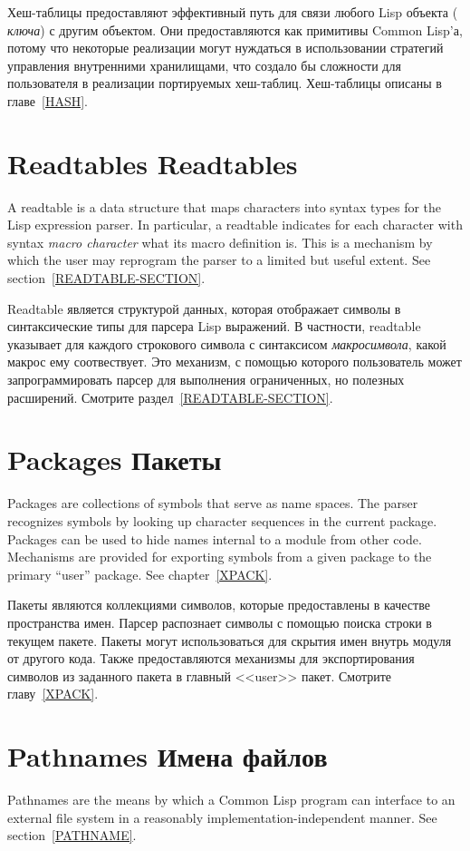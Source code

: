 Хеш-таблицы предоставляют эффективный путь для связи любого Lisp объекта ({\it
 ключа}) с другим объектом. Они предоставляются как примитивы Common Lisp'а,
потому что некоторые реализации могут нуждаться в использовании стратегий
управления внутренними хранилищами, что создало бы сложности для пользователя в
реализации портируемых хеш-таблиц.
Хеш-таблицы описаны в главе~\ref{HASH}.

\section{Readtables Readtables}

A readtable is a data structure that maps characters into syntax
types for the Lisp expression parser.
In particular, a readtable indicates for
each character with syntax {\it macro character} what its macro
definition is.  This is a mechanism by which the user may reprogram
the parser to a limited but useful extent.
See section~\ref{READTABLE-SECTION}.

Readtable является структурой данных, которая отображает символы в
синтаксические типы для парсера Lisp выражений.
В частности, readtable указывает для каждого строкового символа с синтаксисом
{\it макросимвола}, какой макрос ему соотвествует. Это механизм, с помощью
которого пользователь может запрограммировать парсер для выполнения
ограниченных, но полезных расширений.
Смотрите раздел~\ref{READTABLE-SECTION}.

\section{Packages Пакеты}

Packages are collections of symbols that serve as name spaces.
The parser recognizes symbols by looking up character sequences
in the current package.  Packages can be used to hide
names internal to a module from other code.  Mechanisms are provided
for exporting symbols from a given package to the primary ``user'' package.
See chapter~\ref{XPACK}.

Пакеты являются коллекциями символов, которые предоставлены в качестве
пространства имен. Парсер распознает символы с помощью поиска строки в текущем
пакете. Пакеты могут использоваться для скрытия имен внутрь модуля от другого
кода. Также предоставляются механизмы для экспортирования символов из заданного
пакета в главный <<user>> пакет.
Смотрите главу~\ref{XPACK}.

\section{Pathnames Имена файлов}
Pathnames are the means by which a Common Lisp program can
interface to an external file system in a reasonably implementation-independent
manner.  See section~\ref{PATHNAME}.


